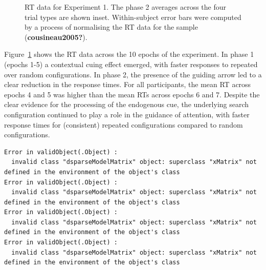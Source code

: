 \documentclass[
  man,
  floatsintext,
  longtable,
  nolmodern,
  notxfonts,
  notimes,
  colorlinks=true,linkcolor=blue,citecolor=blue,urlcolor=blue]{apa7}
\begin{document}
\begin{figure}[H]


\caption{\label{fig-RT-exp1}RT data for Experiment 1. The phase 2
averages across the four trial types are shown inset. Within-subject
error bars were computed by a process of normalising the RT data for the
sample (\textbf{cousineau2005?}).}

\end{figure}%

Figure~\ref{fig-RT-exp1} shows the RT data across the 10 epochs of the
experiment. In phase 1 (epochs 1-5) a contextual cuing effect emerged,
with faster responses to repeated over random configurations. In phase
2, the presence of the guiding arrow led to a clear reduction in the
response times. For all participants, the mean RT across epochs 4 and 5
was higher than the mean RTs across epochs 6 and 7. Despite the clear
evidence for the processing of the endogenous cue, the underlying search
configuration continued to play a role in the guidance of attention,
with faster response times for (consistent) repeated configurations
compared to random configurations.

\begin{verbatim}
Error in validObject(.Object) : 
  invalid class "dsparseModelMatrix" object: superclass "xMatrix" not defined in the environment of the object's class
Error in validObject(.Object) : 
  invalid class "dsparseModelMatrix" object: superclass "xMatrix" not defined in the environment of the object's class
Error in validObject(.Object) : 
  invalid class "dsparseModelMatrix" object: superclass "xMatrix" not defined in the environment of the object's class
Error in validObject(.Object) : 
  invalid class "dsparseModelMatrix" object: superclass "xMatrix" not defined in the environment of the object's class
\end{verbatim}
\end{document}
